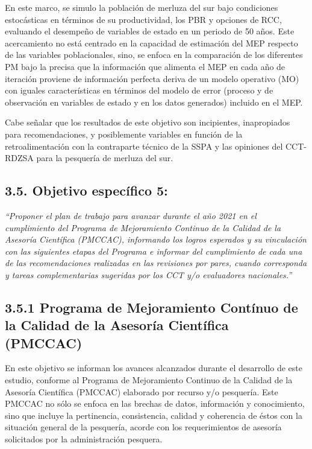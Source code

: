 \documentclass[
  spanish,
]{article}
\begin{document}
En este marco, se simulo la población de merluza del sur bajo
condiciones estocásticas en términos de su productividad, los PBR y
opciones de RCC, evaluando el desempeño de variables de estado en un
periodo de 50 años. Este acercamiento no está centrado en la capacidad
de estimación del MEP respecto de las variables poblacionales, sino, se
enfoca en la comparación de los diferentes PM bajo la precisa que la
información que alimenta el MEP en cada año de iteración proviene de
información perfecta deriva de un modelo operativo (MO) con iguales
características en términos del modelo de error (proceso y de
observación en variables de estado y en los datos generados) incluido en
el MEP.

Cabe señalar que los resultados de este objetivo son incipientes,
inapropiados para recomendaciones, y posiblemente variables en función
de la retroalimentación con la contraparte técnico de la SSPA y las
opiniones del CCT-RDZSA para la pesquería de merluza del sur.

\hypertarget{objetivo-especuxedfico-5}{%
\subsection{3.5. Objetivo específico
5:}\label{objetivo-especuxedfico-5}}

\emph{``Proponer el plan de trabajo para avanzar durante el año 2021 en
el cumplimiento del Programa de Mejoramiento Continuo de la Calidad de
la Asesoría Científica (PMCCAC), informando los logros esperados y su
vinculación con las siguientes etapas del Programa e informar del
cumplimiento de cada una de las recomendaciones realizadas en las
revisiones por pares, cuando corresponda y tareas complementarias
sugeridas por los CCT y/o evaluadores nacionales.''}

\hypertarget{programa-de-mejoramiento-contuxednuo-de-la-calidad-de-la-asesoruxeda-cientuxedfica-pmccac}{%
\subsection{3.5.1 Programa de Mejoramiento Contínuo de la Calidad de la
Asesoría Científica
(PMCCAC)}\label{programa-de-mejoramiento-contuxednuo-de-la-calidad-de-la-asesoruxeda-cientuxedfica-pmccac}}

En este objetivo se informan los avances alcanzados durante el
desarrollo de este estudio, conforme al Programa de Mejoramiento
Continuo de la Calidad de la Asesoría Científica (PMCCAC) elaborado por
recurso y/o pesquería. Este PMCCAC no sólo se enfoca en las brechas de
datos, información y conocimiento, sino que incluye la pertinencia,
consistencia, calidad y coherencia de éstos con la situación general de
la pesquería, acorde con los requerimientos de asesoría solicitados por
la administración pesquera.
\end{document}
